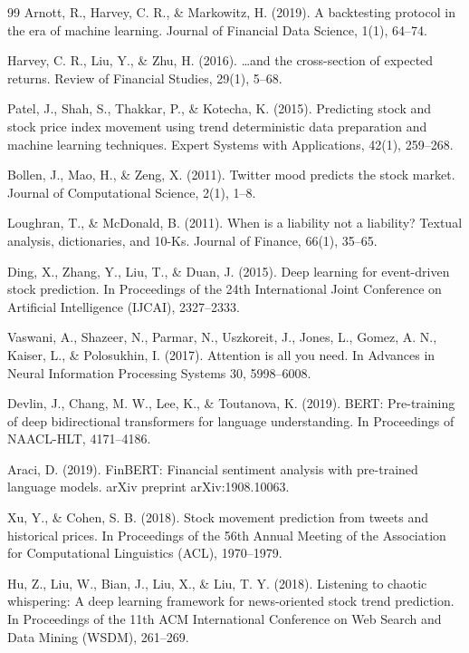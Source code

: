 \documentclass[10pt,a4paper,twocolumn]{article}
\begin{document}
\begin{thebibliography}{99}
 Arnott, R., Harvey, C. R., \& Markowitz, H. (2019). A backtesting protocol in the era of machine learning. Journal of Financial Data Science, 1(1), 64--74.

 Harvey, C. R., Liu, Y., \& Zhu, H. (2016). \ldots and the cross-section of expected returns. Review of Financial Studies, 29(1), 5--68.

 Patel, J., Shah, S., Thakkar, P., \& Kotecha, K. (2015). Predicting stock and stock price index movement using trend deterministic data preparation and machine learning techniques. Expert Systems with Applications, 42(1), 259--268.

 Bollen, J., Mao, H., \& Zeng, X. (2011). Twitter mood predicts the stock market. Journal of Computational Science, 2(1), 1--8.

 Loughran, T., \& McDonald, B. (2011). When is a liability not a liability? Textual analysis, dictionaries, and 10-Ks. Journal of Finance, 66(1), 35--65.

 Ding, X., Zhang, Y., Liu, T., \& Duan, J. (2015). Deep learning for event-driven stock prediction. In Proceedings of the 24th International Joint Conference on Artificial Intelligence (IJCAI), 2327--2333.

 Vaswani, A., Shazeer, N., Parmar, N., Uszkoreit, J., Jones, L., Gomez, A. N., Kaiser, L., \& Polosukhin, I. (2017). Attention is all you need. In Advances in Neural Information Processing Systems 30, 5998--6008.

 Devlin, J., Chang, M. W., Lee, K., \& Toutanova, K. (2019). BERT: Pre-training of deep bidirectional transformers for language understanding. In Proceedings of NAACL-HLT, 4171--4186.

 Araci, D. (2019). FinBERT: Financial sentiment analysis with pre-trained language models. arXiv preprint arXiv:1908.10063.

 Xu, Y., \& Cohen, S. B. (2018). Stock movement prediction from tweets and historical prices. In Proceedings of the 56th Annual Meeting of the Association for Computational Linguistics (ACL), 1970--1979.

 Hu, Z., Liu, W., Bian, J., Liu, X., \& Liu, T. Y. (2018). Listening to chaotic whispering: A deep learning framework for news-oriented stock trend prediction. In Proceedings of the 11th ACM International Conference on Web Search and Data Mining (WSDM), 261--269.


\end{thebibliography}
\end{document}
